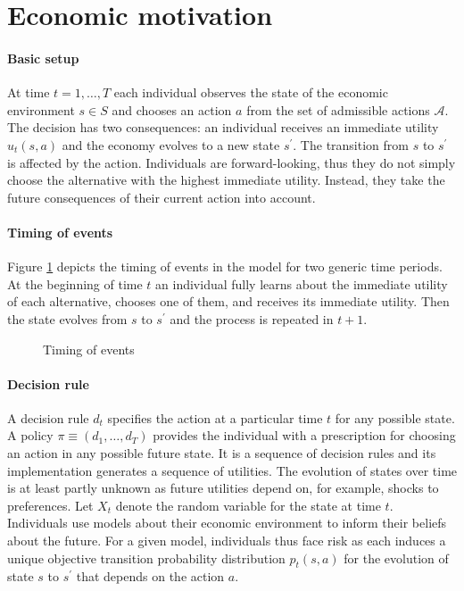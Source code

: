 \section{Economic motivation}
\paragraph{Basic setup} At time $t = 1, \hdots, T$ each individual observes the state of the economic environment $s\in S$ and chooses an action $a$ from the set of admissible actions $\mathcal{A}$. The decision has two consequences: an individual receives an immediate utility $u_t(s, a)$ and the economy evolves to a new state $s^\prime$. The transition from $s$ to $s^\prime$ is affected by the action.  Individuals are forward-looking, thus they do not simply choose the alternative with the highest immediate utility. Instead, they take the future consequences of their current action into account.

\paragraph{Timing of events} Figure \ref{Timing} depicts the timing of events in the model for two generic time periods. At the beginning of time $t$ an individual fully learns about the immediate utility of each alternative, chooses one of them, and receives its immediate utility. Then the state evolves from $s$ to $s^\prime$ and the process is repeated in $t + 1$.
%
\begin{figure}\caption{Timing of events}\label{Timing}\vspace{1.0cm}\centering

\end{figure}
%
\paragraph{Decision rule} A decision rule $d_t$ specifies the action at a particular time $t$ for any possible state. A policy $\pi \equiv(d_1, \hdots, d_T)$ provides the individual with a prescription for choosing an action in any possible future state. It is a sequence of decision rules and its implementation generates a sequence of utilities.  The evolution of states over time is at least partly unknown as future utilities depend on, for example, shocks to preferences. Let $X_t$ denote the random variable for the state at time $t$. Individuals use models about their economic environment to inform their beliefs about the future. For a given model, individuals thus face risk as each induces a unique objective transition probability distribution $p_t(s, a)$ for the evolution of state $s$ to $s^\prime$ that depends on the action $a$.

